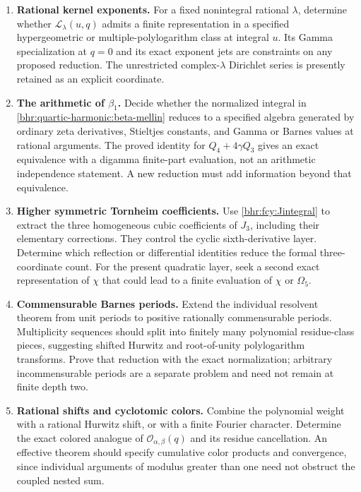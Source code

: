 \documentclass[11pt]{article}
\numberwithin{equation}{section}
\theoremstyle{plain}
\theoremstyle{definition}
\theoremstyle{remark}
\begin{document}
\begin{enumerate}[label=\textbf{F\arabic*.},leftmargin=*,itemsep=9pt]
 \item \textbf{Rational kernel exponents.}
 For a fixed nonintegral rational $\lambda$, determine whether
 $\mathcal L_\lambda(u,q)$ admits a finite representation in a
 specified hypergeometric or multiple-polylogarithm class at
 integral $u$. Its Gamma specialization at $q=0$ and its exact
 exponent jets are constraints on any proposed reduction. The
 unrestricted complex-$\lambda$ Dirichlet series is presently
 retained as an explicit coordinate.

 \item \textbf{The arithmetic of $\beta_1$.}
 Decide whether the normalized integral in
 \eqref{bhr:quartic-harmonic:beta-mellin} reduces to a specified
 algebra generated by ordinary zeta derivatives, Stieltjes
 constants, and Gamma or Barnes values at rational arguments.
 The proved identity for $Q_4+4\gamma Q_3$ gives an exact
 equivalence with a digamma finite-part evaluation, not an
 arithmetic independence statement. A new reduction must add
 information beyond that equivalence.

 \item \textbf{Higher symmetric Tornheim coefficients.}
 Use \eqref{bhr:fcy:Jintegral} to extract the three homogeneous cubic
 coefficients of $J_3$, including their elementary corrections.
 They control the cyclic sixth-derivative layer. Determine which
 reflection or differential identities reduce the formal
 three-coordinate count. For the present quadratic layer, seek
 a second exact representation of $\chi$ that could lead to a
 finite evaluation of $\chi$ or $\Omega_5$.

 \item \textbf{Commensurable Barnes periods.}
 Extend the individual resolvent theorem from unit periods to
 positive rationally commensurable periods. Multiplicity
 sequences should split into finitely many polynomial
 residue-class pieces, suggesting shifted Hurwitz and root-of-unity
 polylogarithm transforms. Prove that reduction with the exact
 normalization; arbitrary incommensurable periods are a separate
 problem and need not remain at finite depth two.

 \item \textbf{Rational shifts and cyclotomic colors.}
 Combine the polynomial weight with a rational Hurwitz shift,
 or with a finite Fourier character. Determine the exact
 colored analogue of $\mathcal O_{\alpha,\beta}(q)$ and its
 residue cancellation. An effective theorem should specify
 cumulative color products and convergence, since individual
 arguments of modulus greater than one need not obstruct the
 coupled nested sum.


\end{enumerate}
\end{document}
